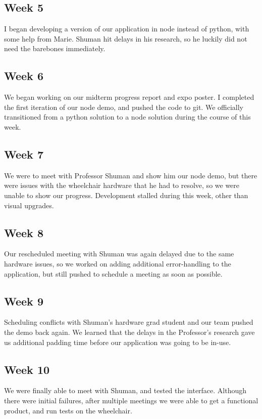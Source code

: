 \documentclass[onecolumn, draftclsnofoot,10pt, compsoc]{IEEEtran}
\begin{document}
\subsection{Week 5}
I began developing a version of our application in node instead of python, with some help from Marie. Shuman hit delays in his research, so he luckily did not need the barebones immediately. 

\subsection{Week 6}
We began working on our midterm progress report and expo poster. I completed the first iteration of our node demo, and pushed the code to git. We officially transitioned from a python solution to a node solution during the course of this week.

\subsection{Week 7}
We were to meet with Professor Shuman and show him our node demo, but there were issues with the wheelchair hardware that he had to resolve, so we were unable to show our progress. Development stalled during this week, other than visual upgrades.

\subsection{Week 8}
Our rescheduled meeting with Shuman was again delayed due to the same hardware issues, so we worked on adding additional error-handling to the application, but still pushed to schedule a meeting as soon as possible. 

\subsection{Week 9}
Scheduling conflicts with Shuman’s hardware grad student and our team pushed the demo back again. We learned that the delays in the Professor’s research gave us additional padding time before our application was going to be in-use.

\subsection{Week 10}
We were finally able to meet with Shuman, and tested the interface. Although there were initial failures, after multiple meetings we were able to get a functional product, and run tests on the wheelchair.
\end{document}
